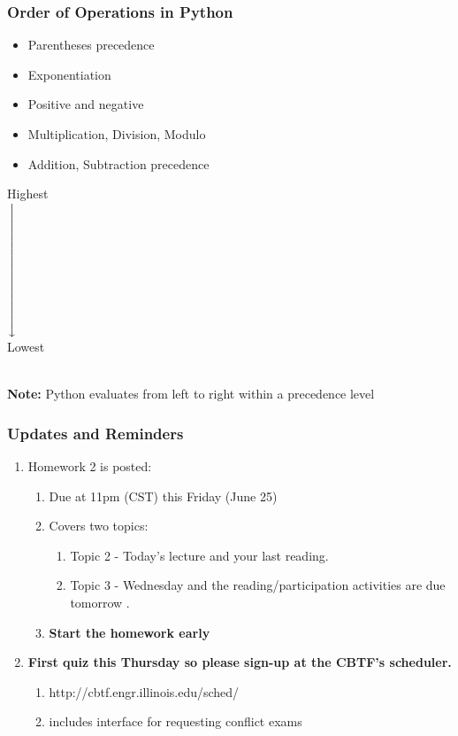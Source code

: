 \documentclass{beamer}
\newcommand{\xdownarrow}[1]{%
  {\left\downarrow\vbox to #1{}\right.\kern-\nulldelimiterspace}
}
\begin{document}
\begin{frame}
  \frametitle{Order of Operations in Python}
  \centering
  \begin{minipage}{0.49\textwidth}
    \begin{itemize}
      \item Parentheses precedence
      \item Exponentiation
      \item Positive and negative
      \item Multiplication, Division, Modulo
      \item Addition, Subtraction precedence
    \end{itemize}
  \end{minipage}
  \begin{minipage}{0.2\textwidth}
    \centering
    Highest\\
    $\xdownarrow{2cm}$\\
    Lowest\\
  \end{minipage}
  \vfill\\
  \textbf{Note:} Python evaluates from left to right within a precedence level
\end{frame}



%
%
%
\begin{frame}[fragile]
  \frametitle{Updates and Reminders}
  \begin{enumerate}
    \item Homework 2 is posted:
      \begin{enumerate}
        \item Due at 11pm (CST) this Friday (June 25)
        \item Covers two topics:
          \begin{enumerate}
            \item Topic 2 - Today's lecture and your last reading.
            \item Topic 3 - Wednesday and the reading/participation activities are due tomorrow .
          \end{enumerate}
        \item \textbf{Start the homework early}
      \end{enumerate}
    \item \textbf{First quiz this Thursday so please sign-up at the CBTF's scheduler.}
      \begin{enumerate}
        \item http://cbtf.engr.illinois.edu/sched/
        \item includes interface for requesting conflict exams
      \end{enumerate}
  \end{enumerate}
\end{frame}
\end{document}
